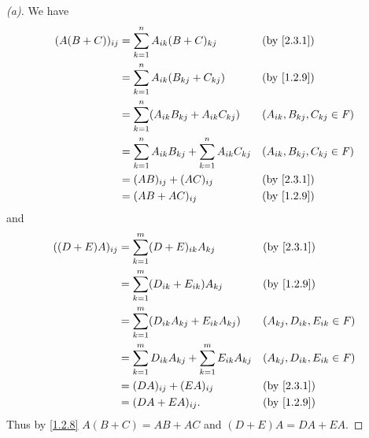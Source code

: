 \begin{proof}[(a)]
  We have
  \begin{align*}
    (A (B + C))_{i j} & = \sum_{k = 1}^n A_{i k} (B + C)_{k j}                            &  & \by{2.3.1}                         \\
                      & = \sum_{k = 1}^n A_{i k} (B_{k j} + C_{k j})                      &  & \by{1.2.9}                         \\
                      & = \sum_{k = 1}^n (A_{i k} B_{k j} + A_{i k} C_{k j})              &  & (A_{i k}, B_{k j}, C_{k j} \in \F) \\
                      & = \sum_{k = 1}^n A_{i k} B_{k j} + \sum_{k = 1}^n A_{i k} C_{k j} &  & (A_{i k}, B_{k j}, C_{k j} \in \F) \\
                      & = (AB)_{i j} + (AC)_{i j}                                         &  & \by{2.3.1}                         \\
                      & = (AB + AC)_{i j}                                                 &  & \by{1.2.9}
  \end{align*}
  and
  \begin{align*}
    ((D + E) A)_{i j} & = \sum_{k = 1}^m (D + E)_{i k} A_{k j}                            &  & \by{2.3.1}                         \\
                      & = \sum_{k = 1}^m (D_{i k} + E_{i k}) A_{k j}                      &  & \by{1.2.9}                         \\
                      & = \sum_{k = 1}^m (D_{i k} A_{k j} + E_{i k} A_{k j})              &  & (A_{k j}, D_{i k}, E_{i k} \in \F) \\
                      & = \sum_{k = 1}^m D_{i k} A_{k j} + \sum_{k = 1}^m E_{i k} A_{k j} &  & (A_{k j}, D_{i k}, E_{i k} \in \F) \\
                      & = (DA)_{i j} + (EA)_{i j}                                         &  & \by{2.3.1}                         \\
                      & = (DA + EA)_{i j}.                                                &  & \by{1.2.9}
  \end{align*}
  Thus by \cref{1.2.8} \(A (B + C) = AB + AC\) and \((D + E) A = DA + EA\).
\end{proof}

